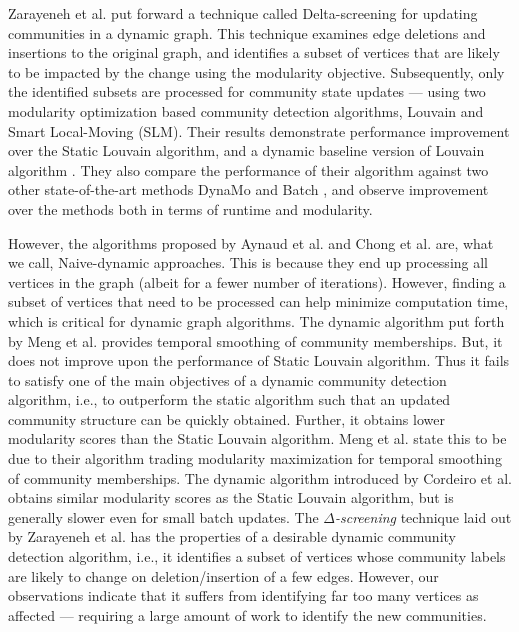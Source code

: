 Zarayeneh et al. \cite{com-zarayeneh21} put forward a technique called Delta-screening for updating communities in a dynamic graph. This technique examines edge deletions and insertions to the original graph, and identifies a subset of vertices that are likely to be impacted by the change using the modularity objective. Subsequently, only the identified subsets are processed for community state updates --- using two modularity optimization based community detection algorithms, Louvain and Smart Local-Moving (SLM). Their results demonstrate performance improvement over the Static Louvain algorithm, and a dynamic baseline version of Louvain algorithm \cite{com-aynaud10}. They also compare the performance of their algorithm against two other state-of-the-art methods DynaMo \cite{com-zhuang19} and Batch \cite{com-chong13}, and observe improvement over the methods both in terms of runtime and modularity.

However, the algorithms proposed by Aynaud et al. \cite{com-aynaud10} and Chong et al. \cite{com-chong13} are, what we call, Naive-dynamic approaches. This is because they end up processing all vertices in the graph (albeit for a fewer number of iterations). However, finding a subset of vertices that need to be processed can help minimize computation time, which is critical for dynamic graph algorithms. The dynamic algorithm put forth by Meng et al. \cite{com-meng16} provides temporal smoothing of community memberships. But, it does not improve upon the performance of Static Louvain algorithm. Thus it fails to satisfy one of the main objectives of a dynamic community detection algorithm, i.e., to outperform the static algorithm such that an updated community structure can be quickly obtained. Further, it obtains lower modularity scores than the Static Louvain algorithm. Meng et al. state this to be due to their algorithm trading modularity maximization for temporal smoothing of community memberships. The dynamic algorithm introduced by Cordeiro et al. \cite{com-cordeiro16} obtains similar modularity scores as the Static Louvain algorithm, but is generally slower even for small batch updates. The \textit{$\Delta$-screening} technique laid out by Zarayeneh et al. \cite{com-zarayeneh21} has the properties of a desirable dynamic community detection algorithm, i.e., it identifies a subset of vertices whose community labels are likely to change on deletion/insertion of a few edges. However, our observations indicate that it suffers from identifying far too many vertices as affected --- requiring a large amount of work to identify the new communities.

